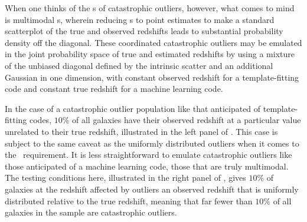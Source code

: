 When one thinks of the \pzpdf s of catastrophic outliers, however, what comes to mind is multimodal \pzpdf s, wherein reducing \pzpdf s to point estimates to make a standard scatterplot of the true and observed redshifts leads to substantial probability density off the diagonal.
These coordinated catastrophic outliers may be emulated in the joint probability space of true and estimated redshifts by using a mixture of the unbiased diagonal defined by the intrinsic scatter and an additional Gaussian in one dimension, with constant observed redshift for a template-fitting code and constant true redshift for a machine learning code.

In the case of a catastrophic outlier population like that anticipated of template-fitting codes, $10\%$ of all galaxies have their observed redshift at a particular value unrelated to their true redshift, illustrated in the left panel of .
This case is subject to the same caveat as the uniformly distributed outliers when it comes to the \lsst\ requirement.
It is less straightforward to emulate catastrophic outliers like those anticipated of a machine learning code, those that are truly multimodal.
The testing conditions here, illustrated in the right panel of , gives $10\%$ of galaxies at the redshift affected by outliers an observed redshift that is uniformly distributed relative to the true redshift, meaning that far fewer than $10\%$ of all galaxies in the sample are catastrophic outliers.

